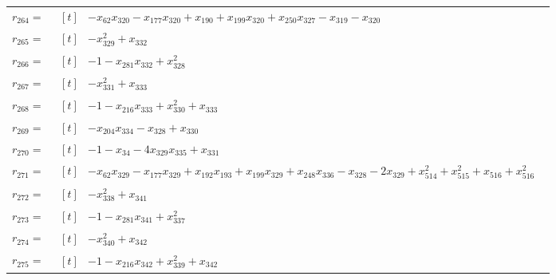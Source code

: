 \begin{longtable}{@{}r p{0.92\linewidth}@{}}
$r_{264}=$ & $\begin{aligned}[t]&-x_{62}x_{320}-x_{177}x_{320}+x_{190}+x_{199}x_{320}+x_{250}x_{327}-x_{319}-x_{320}\end{aligned}$ \\[2pt]
$r_{265}=$ & $\begin{aligned}[t]&-x_{329}^{2}+x_{332}\end{aligned}$ \\[2pt]
$r_{266}=$ & $\begin{aligned}[t]&-1-x_{281}x_{332}+x_{328}^{2}\end{aligned}$ \\[2pt]
$r_{267}=$ & $\begin{aligned}[t]&-x_{331}^{2}+x_{333}\end{aligned}$ \\[2pt]
$r_{268}=$ & $\begin{aligned}[t]&-1-x_{216}x_{333}+x_{330}^{2}+x_{333}\end{aligned}$ \\[2pt]
$r_{269}=$ & $\begin{aligned}[t]&-x_{204}x_{334}-x_{328}+x_{330}\end{aligned}$ \\[2pt]
$r_{270}=$ & $\begin{aligned}[t]&-1-x_{34}-4x_{329}x_{335}+x_{331}\end{aligned}$ \\[2pt]
$r_{271}=$ & $\begin{aligned}[t]&-x_{62}x_{329}-x_{177}x_{329}+x_{192}x_{193}+x_{199}x_{329}+x_{248}x_{336}-x_{328}-2x_{329}+x_{514}^{2}+x_{515}^{2}+x_{516}+x_{516}^{2}\end{aligned}$ \\[2pt]
$r_{272}=$ & $\begin{aligned}[t]&-x_{338}^{2}+x_{341}\end{aligned}$ \\[2pt]
$r_{273}=$ & $\begin{aligned}[t]&-1-x_{281}x_{341}+x_{337}^{2}\end{aligned}$ \\[2pt]
$r_{274}=$ & $\begin{aligned}[t]&-x_{340}^{2}+x_{342}\end{aligned}$ \\[2pt]
$r_{275}=$ & $\begin{aligned}[t]&-1-x_{216}x_{342}+x_{339}^{2}+x_{342}\end{aligned}$ \\[2pt]

\end{longtable}
